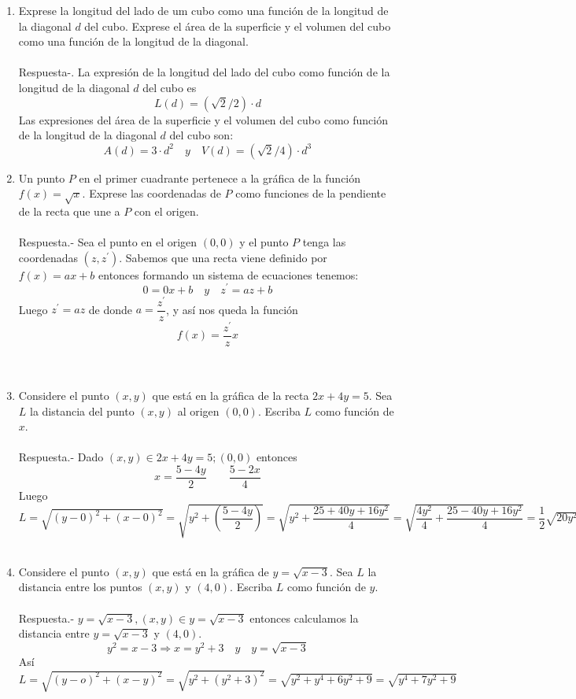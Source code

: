 \begin{enumerate}
    \item Exprese la longitud del lado de um cubo como una función de la longitud de la diagonal $d$ del cubo. Exprese el área de la superficie y el volumen del cubo como una función de la longitud de la diagonal.\\\\
	Respuesta-.\; La expresión de la longitud del lado del cubo como función de la longitud de la diagonal $d$ del cubo es  $$ L(d) = (\sqrt{2}/2)\cdot d $$ 
	Las expresiones del área de la superficie y el volumen del cubo como función de la longitud de la diagonal $d$ del cubo son:
	$$A(d) = 3\cdot d^2 \quad    y \quad  V(d) = (\sqrt{2}/4)\cdot d^3$$

    \item Un punto $P$ en el primer cuadrante pertenece a la gráfica de la función $f(x)=\sqrt{x}$. Exprese las coordenadas de $P$ como funciones de la pendiente de la recta que une a $P$ con el origen.\\\\
	Respuesta.-\; Sea el punto en el origen $(0,0)$ y el punto $P$ tenga las coordenadas $(z,z^{'})$. Sabemos que una recta viene definido por $f(x)=ax+b$ entonces formando un sistema de ecuaciones tenemos:
	$$0=0x + b \quad y \quad z^{'} = az + b$$
	Luego $z^{'}=az$ de donde $a=\dfrac{z^{'}}{z}$, y así nos queda la función  
	$$f(x)=\dfrac{z^{'}}{z} x$$\\\\

    \item Considere el punto $(x,y)$ que está en la gráfica de la recta $2x + 4y = 5$. Sea $L$ la distancia del punto $(x, y)$ al origen $(0, 0)$. Escriba $L$ como función de $x$.\\\\
	Respuesta.-\; Dado $(x,y) \in 2x+4y=5 ; (0,0)$ entonces $$x=\dfrac{5-4y}{2} \qquad \dfrac{5-2x}{4}$$
	Luego $L=\sqrt{(y-0)^2+(x-0)^2} = \sqrt{y^2 + \left( \dfrac{5-4y}{2}\right)}=\sqrt{y^2 + \dfrac{25+40y+16y^2}{4}}=\sqrt{\dfrac{4y^2}{4} + \dfrac{25 - 40y + 16y^2}{4}} = \dfrac{1}{2} \sqrt{20y^2 + 40y + 25}$\\\\
 
    \item Considere el punto $(x, y)$ que está en la gráfica de $y = \sqrt{x - 3}$. Sea $L$ la distancia entre los puntos $(x,y)$ y $(4,0)$. Escriba $L$ como función de $y$.\\\\
	Respuesta.-\; $y=\sqrt{x-3}, (x,y)\in y=\sqrt{x-3}$ entonces calculamos la distancia entre $y=\sqrt{x-3}$ y $(4,0)$.\\
	$$y^2=x-3 \Longrightarrow x=y^2 + 3 \quad y \quad y=\sqrt{x-3}$$ 
	Así $L=\sqrt{(y-o)^2 + (x-y)^2} = \sqrt{y^2 + (y^2 + 3)^2} = \sqrt{y^2 + y^4 + 6y^2 + 9} = \sqrt{y^4+7y^2+9}$\\\\


\end{enumerate}

